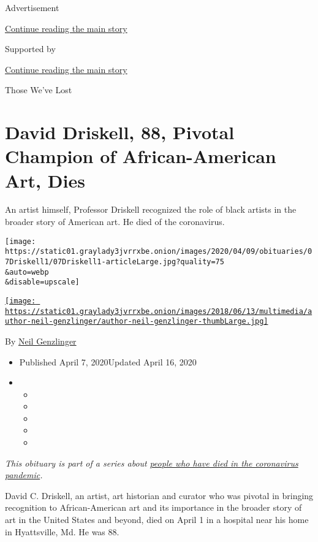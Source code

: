 Advertisement

\protect\hyperlink{after-top}{Continue reading the main story}

Supported by

\protect\hyperlink{after-sponsor}{Continue reading the main story}

Those We've Lost

\hypertarget{david-driskell-88-pivotal-champion-of-african-american-art-dies}{%
\section{David Driskell, 88, Pivotal Champion of African-American Art,
Dies}\label{david-driskell-88-pivotal-champion-of-african-american-art-dies}}

An artist himself, Professor Driskell recognized the role of black
artists in the broader story of American art. He died of the
coronavirus.

\texttt{[image: https://static01.graylady3jvrrxbe.onion/images/2020/04/09/obituaries/07Driskell1/07Driskell1-articleLarge.jpg?quality=75\\\&auto=webp\\\&disable=upscale]}

\href{https://www.nytimes3xbfgragh.onion/by/neil-genzlinger}{\texttt{[image: https://static01.graylady3jvrrxbe.onion/images/2018/06/13/multimedia/author-neil-genzlinger/author-neil-genzlinger-thumbLarge.jpg]}}

By \href{https://www.nytimes3xbfgragh.onion/by/neil-genzlinger}{Neil
Genzlinger}

\begin{itemize}
\item
  Published April 7, 2020Updated April 16, 2020
\item
  \begin{itemize}
  \item
  \item
  \item
  \item
  \item
  \end{itemize}
\end{itemize}

\emph{This obituary is part of a series about}
\href{https://www.nytimes3xbfgragh.onion/series/people-who-have-died-of-the-coronavirus}{\emph{people
who have died in the coronavirus pandemic}}\emph{.}

David C. Driskell, an artist, art historian and curator who was pivotal
in bringing recognition to African-American art and its importance in
the broader story of art in the United States and beyond, died on April
1 in a hospital near his home in Hyattsville, Md. He was 88.

